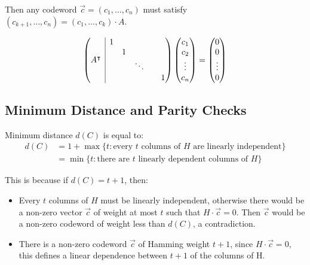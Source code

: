 \documentclass[11pt]{article}
\begin{document}
Then any codeword $\overrightarrow{c} = (c_1, \ldots, c_n)$ must satisfy $(c_{k + 1}, \ldots, c_n) = (c_1, \ldots, c_k) \cdot A$.

\[
  \left( \begin{array}{@{}c|c@{}}
    A^\intercal &
     \begin{matrix}
        1 & & & \\
        & 1 & & \\
        & & \ddots & \\
        & & & & 1
     \end{matrix} 
  \end{array} \right)
  \begin{pmatrix}
    c_1 \\
    c_2 \\
    \vdots \\
    c_n
  \end{pmatrix}
  =
  \begin{pmatrix}
    0 \\
    0 \\
    \vdots \\
    0
  \end{pmatrix}
\]

\subsection{Minimum Distance and Parity Checks}
Minimum distance $d(C)$ is equal to:
\begin{align*}
  d(C) &= 1 + \max \{ t : \text{every } t \text{ columns of } H \text{ are linearly independent}\} \\
  &= \min\{t : \text{there are } t \text{ linearly dependent columns of } H\}
\end{align*}

This is because if $d(C) = t + 1$, then:
\begin{itemize}
  \item Every $t$ columns of $H$ must be linearly independent, otherwise there would be a non-zero vector $\overrightarrow{c}$ of weight at most $t$ such that $H \cdot \overrightarrow{c} = 0$.
    Then $\overrightarrow{c}$ would be a non-zero codeword of weight less than $d(C)$, a contradiction.
  \item There is a non-zero codeword $\overrightarrow{c}$ of Hamming weight $t + 1$, since $H \cdot \overrightarrow{c} = 0$, this defines a linear dependence between $t + 1$ of the columns of H.
\end{itemize}
\end{document}
